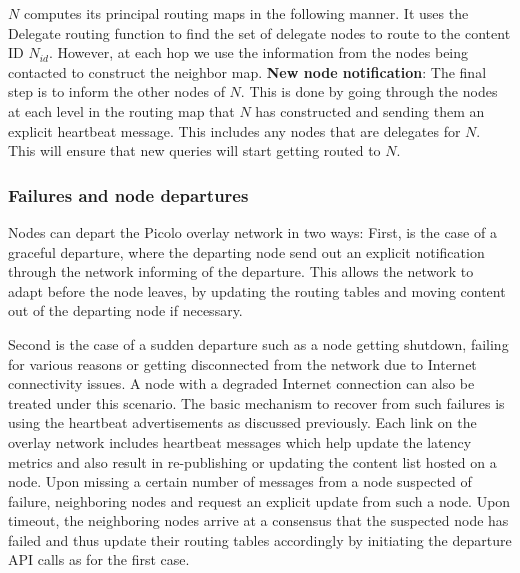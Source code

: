 \(N\) computes its principal routing maps in the following manner. It uses the Delegate routing function to find the set of delegate
nodes to route to the content ID \(N_{id}\). However, at each hop we use the information from the nodes being contacted
to construct the neighbor map.
\newline\newline
\textbf{New node notification}: The final step is to inform the other nodes of \(N\). This is done by going through the
nodes at each level in the routing map that \(N\) has constructed and sending them an explicit heartbeat message. This
includes any nodes that are delegates for \(N\). This will ensure that new queries will start getting routed to \(N\).

\subsubsection{Failures and node departures}

Nodes can depart the \textsf{Picolo} overlay network in two ways: First, is the case of a graceful departure, where the departing
node send out an explicit notification through the network informing of the departure. This allows the network to adapt
before the node leaves, by updating the routing tables and moving content out of the departing node if necessary.

Second is the case of a sudden departure such as a node getting shutdown, failing for various reasons or getting
disconnected from the network due to Internet connectivity issues. A node with a degraded Internet connection can also
be treated under this scenario. The basic mechanism to recover from such failures is using the heartbeat advertisements
as discussed previously. Each link on the overlay network includes heartbeat messages which help update the latency
metrics and also result in re-publishing or updating the content list hosted on a node. Upon missing a certain number of
messages from a node suspected of failure, neighboring nodes and request an explicit update from such a node. Upon
timeout, the neighboring nodes arrive at a consensus that the suspected node has failed and thus update their routing
tables accordingly by initiating the departure API calls as for the first case.

